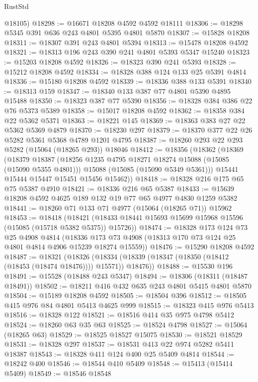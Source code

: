 \begin{lexlean}{RustStd}
\begin{coremodule}
      @18105)
@18298 := @16671 @18208 @4592 @4592 @18111
@18306 := @18298 @5345 @391 @636 @243 @4801 @5395 @4801 @5870
@18307 := @15828 @18208
@18311 := @18307 @391 @243 @4801 @5394
@18313 := @15478 @18208 @4592
@18321 := @18313 @196 @243 @390 @241 @4801 @5393 @5347 @15240
@18323 := @15203 @18208 @4592
@18326 := @18323 @390 @241 @5393
@18328 := @15212 @18208 @4592
@18334 := @18328 @388 @124 @133 @25 @5391 @4814
@18336 := @15180 @18208 @4592
@18339 := @18336 @388 @133 @5391
@18340 := @18313 @159
@18347 := @18340 @133 @387 @77 @4801 @5390 @4895 @15488
@18350 := @18323 @387 @77 @5390
@18356 := @18328 @384 @386 @22 @76 @5373 @5389
@18358 := @15017 @18208 @4592
@18362 := @18358 @384 @22 @5362 @5371
@18363 := @18221 @145
@18369 := @18363 @383 @27 @22 @5362 @5369 @4879
@18370 := @18230 @297
@18379 := @18370 @377 @22 @26 @5282 @5361 @5368 @4789 @1201 @4795
@18387 := @18260 @293 @22 @293 @5282 (@15064 (@18265 @293)) @18046
@18412 := @18356
    (@18362
      (@18369
        (@18379
          @18387
          (@18256 @1235 @4795 @18271 @18274 @15088 (@15085 (@15090 @5355 @4801)))
          @15088
          (@15085 (@15090 @5349 @5361)))
        @15441
        @15444
        @15447
        @15451
        @15456
        @15462))
@18418 := @18328 @216 @175 @65 @75 @5387 @4910
@18421 := @18336 @216 @65 @5387
@18433 := @15639 @18208 @4592 @4625 @189 @132 @19 @77 @65 @4977 @4830 @1259 @5382
@18441 := @18260 @71 @133 @71 @4977 (@15064 (@18265 @71)) @15962
@18453 := @18418
    (@18421 (@18433 @18441 @15693 @15699 @15968 @15596 (@15085 (@15718 @5382 @5375)) @15726))
@18474 := @18328
    @173
    @124
    @73
    @25
    @4908
    @4814
    (@18336 @173 @73 @4908 (@18313 @170 @73 @124 @25 @4801 @4814 @4906 @15239 @18274 @15559))
@18476 := @15290 @18208 @4592
@18487 := @18321
    (@18326 (@18334 (@18339 (@18347 (@18350 (@18412 (@18453 (@18474 @18476)))) @15571)) @18476))
@18488 := @15530 @196
@18491 := @15528 (@18488 @243 @5347)
@18494 := @18306 (@18311 (@18487 @18491))
@18502 := @18211 @416 @432 @635 @243 @4801 @5415 @4801 @5870
@18504 := @15189 @18208 @4592
@18505 := @18504 @396
@18512 := @18505 @415 @976 @84 @4801 @5413 @4625 @999
@18515 := @18323 @415 @976 @5413
@18516 := @18328 @122
@18521 := @18516 @414 @35 @975 @4798 @5412
@18524 := @18260 @63 @35 @63
@18525 := @18524 @4798
@18527 := @15064 (@18265 @63)
@18529 := @18525 @18527 @15075
@18530 := @18521 @18529
@18531 := @18328 @297
@18537 := @18531 @413 @22 @974 @5282 @5411 @18387
@18543 := @18328 @411 @124 @400 @25 @5409 @4814
@18544 := @18242 @400
@18546 := @18544 @410 @5409
@18548 := @15413 (@15414 @5409)
@18549 := @18546 @18548

\end{coremodule}
\end{lexlean}
